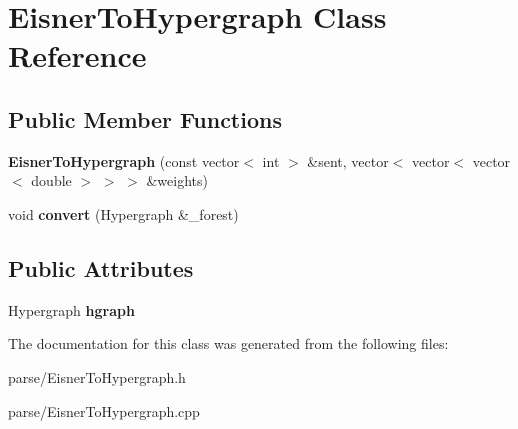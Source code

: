 \hypertarget{class_eisner_to_hypergraph}{
\section{EisnerToHypergraph Class Reference}
\label{class_eisner_to_hypergraph}
}
\subsection*{Public Member Functions}
\begin{DoxyCompactItemize}
\item 
\hypertarget{class_eisner_to_hypergraph_ac4c11a966298244ad74965dd35596c4c}{
{\bfseries EisnerToHypergraph} (const vector$<$ int $>$ \&sent, vector$<$ vector$<$ vector$<$ double $>$ $>$ $>$ \&weights)}
\label{class_eisner_to_hypergraph_ac4c11a966298244ad74965dd35596c4c}

\item 
\hypertarget{class_eisner_to_hypergraph_a8344d534c1b3d5f2795578c771fe4d31}{
void {\bfseries convert} (Hypergraph \&\_\-forest)}
\label{class_eisner_to_hypergraph_a8344d534c1b3d5f2795578c771fe4d31}

\end{DoxyCompactItemize}
\subsection*{Public Attributes}
\begin{DoxyCompactItemize}
\item 
\hypertarget{class_eisner_to_hypergraph_a47df02a8804876cc0e33b55681b9a2f0}{
Hypergraph {\bfseries hgraph}}
\label{class_eisner_to_hypergraph_a47df02a8804876cc0e33b55681b9a2f0}

\end{DoxyCompactItemize}


The documentation for this class was generated from the following files:\begin{DoxyCompactItemize}
\item 
parse/EisnerToHypergraph.h\item 
parse/EisnerToHypergraph.cpp\end{DoxyCompactItemize}
